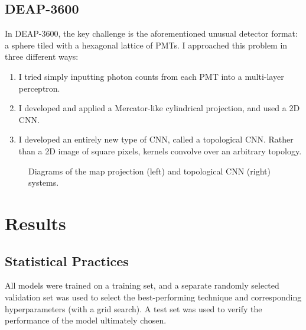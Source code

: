 \documentclass[12pt]{article}
\begin{document}
\subsection{DEAP-3600}

In DEAP-3600, the key challenge is the aforementioned unusual detector format: a sphere tiled with a hexagonal lattice of PMTs. I approached this problem in three different ways:

\begin{enumerate}
    \item I tried simply inputting photon counts from each PMT into a multi-layer perceptron.
    \item I developed and applied a Mercator-like cylindrical projection, and used a 2D CNN.
    \item I developed an entirely new type of CNN, called a topological CNN. Rather than a 2D image of square pixels, kernels convolve over an arbitrary topology.
\end{enumerate}

\begin{figure}[ht]
    \centering
    \qquad
    \caption{Diagrams of the map projection (left) and topological CNN (right) systems.}
\end{figure}

\section{Results}

\subsection{Statistical Practices}

All models were trained on a training set, and a separate randomly selected validation set was used to select the best-performing technique and corresponding hyperparameters (with a grid search). A test set was used to verify the performance of the model ultimately chosen.
\end{document}
